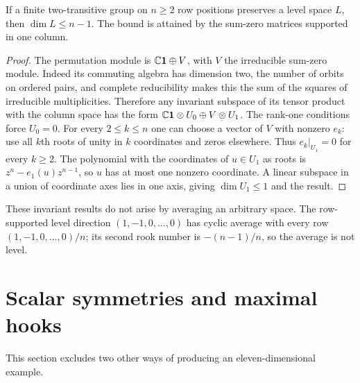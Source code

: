 \begin{proposition}\label{prop:twotransitive}
If a finite two-transitive group on $n\geq2$ row positions preserves a level space $L$, then $\dim L\leq n-1$. The bound is attained by the sum-zero matrices supported in one column.
\end{proposition}
\begin{proof}
The permutation module is $\mathbb C\mathbf1\oplus V$, with $V$ the irreducible sum-zero module. Indeed its commuting algebra has dimension two, the number of orbits on ordered pairs, and complete reducibility makes this the sum of the squares of irreducible multiplicities. Therefore any invariant subspace of its tensor product with the column space has the form
$\mathbb C\mathbf1\otimes U_0\oplus V\otimes U_1$.
The rank-one conditions force $U_0=0$. For every $2\leq k\leq n$ one can choose a vector of $V$ with nonzero $e_k$: use all $k$th roots of unity in $k$ coordinates and zeros elsewhere. Thus $e_k|_{U_1}=0$ for every $k\geq2$. The polynomial with the coordinates of $u\in U_1$ as roots is $z^n-e_1(u)z^{n-1}$, so $u$ has at most one nonzero coordinate. A linear subspace in a union of coordinate axes lies in one axis, giving $\dim U_1\leq1$ and the result.
\end{proof}

These invariant results do not arise by averaging an arbitrary space. The row-supported level direction $(1,-1,0,\ldots,0)$ has cyclic average with every row $(1,-1,0,\ldots,0)/n$; its second rook number is $-(n-1)/n$, so the average is not level.

\section{Scalar symmetries and maximal hooks}
This section excludes two other ways of producing an eleven-dimensional example.

